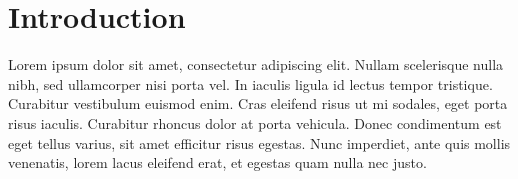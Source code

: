 \chapter{Introduction}
\label{chap:introduction}

Lorem ipsum dolor sit amet, consectetur adipiscing elit. Nullam scelerisque nulla nibh, sed ullamcorper nisi porta vel. In iaculis ligula id lectus tempor tristique. Curabitur vestibulum euismod enim. Cras eleifend risus ut mi sodales, eget porta risus iaculis. Curabitur rhoncus dolor at porta vehicula. Donec condimentum est eget tellus varius, sit amet efficitur risus egestas. Nunc imperdiet, ante quis mollis venenatis, lorem lacus eleifend erat, et egestas quam nulla nec justo.
